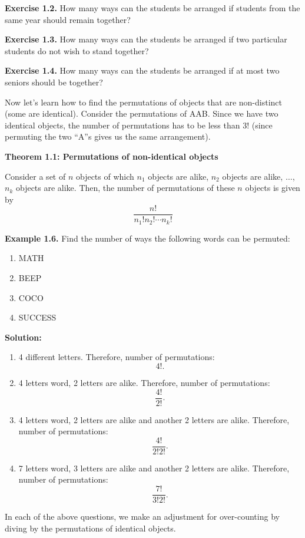 \documentclass[
  12pt,
]{krantzNoCorner}
\providecommand{\tightlist}{%
  \setlength{\itemsep}{0pt}\setlength{\parskip}{0pt}}
\begin{document}
\textbf{Exercise 1.2.} How many ways can the students be arranged if students
from the same year should remain together?

\textbf{Exercise 1.3.} How many ways can the students be arranged if two
particular students do not wish to stand together?

\textbf{Exercise 1.4.} How many ways can the students be arranged if at most
two seniors should be together?

Now let's learn how to find the permutations of objects that are
non-distinct (some are identical). Consider the permutations of AAB.
Since we have two identical objects, the number of permutations has to
be less than \(3!\) (since permuting the two ``A''s gives us the same
arrangement).

\textbf{Theorem 1.1: Permutations of non-identical objects}

Consider a set of \(n\) objects of which \(n_1\) objects are alike, \(n_2\)
objects are alike, \(\dots\), \(n_k\) objects are alike. Then, the number of
permutations of these \(n\) objects is given by
\[\frac{n!}{n_1!n_2!\cdots n_k!}\]

\textbf{Example 1.6.} Find the number of ways the following words can be
permuted:

\begin{enumerate}
\def\labelenumi{\arabic{enumi}.}
\tightlist
\item
  MATH
\item
  BEEP
\item
  COCO
\item
  SUCCESS
\end{enumerate}

\textbf{Solution:}

\begin{enumerate}
\def\labelenumi{\arabic{enumi}.}
\tightlist
\item
  4 different letters. Therefore, number of permutations: \[4!.\]
\item
  4 letters word, 2 letters are alike. Therefore, number of
  permutations: \[\frac{4!}{2!}.\]
\item
  4 letters word, 2 letters are alike and another 2 letters are alike.
  Therefore, number of permutations: \[\frac{4!}{2!2!}.\]
\item
  7 letters word, 3 letters are alike and another 2 letters are alike.
  Therefore, number of permutations: \[\frac{7!}{3!2!}.\]
\end{enumerate}

In each of the above questions, we make an adjustment for over-counting
by diving by the permutations of identical objects.
\end{document}
